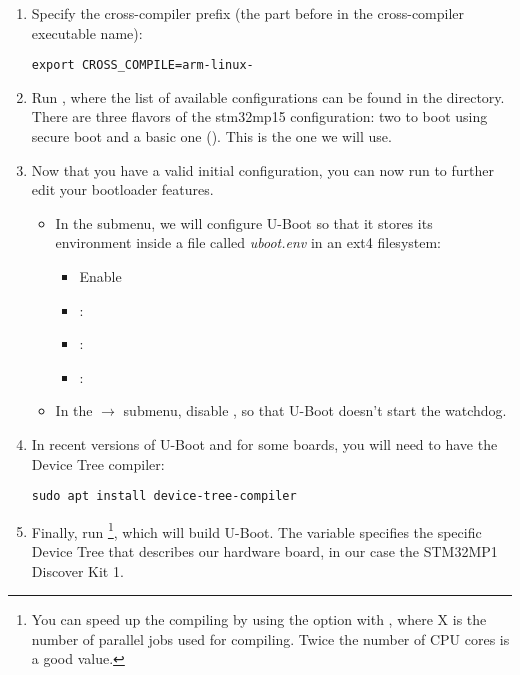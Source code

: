 \begin{enumerate}

\item Specify the cross-compiler prefix
(the part before  in the cross-compiler executable name):
\begin{verbatim}
export CROSS_COMPILE=arm-linux-
\end{verbatim}

\item Run , where the list of available
  configurations can be found in the  directory. There
  are three flavors of the stm32mp15 configuration: two to boot using
  secure boot and a basic one (). This is the
  one we will use.

\item Now that you have a valid initial configuration, you can now
  run  to further edit your bootloader features.
  \begin{itemize}
  \item In the  submenu, we will configure U-Boot so
    that it stores its environment inside a file called {\em
      uboot.env} in an ext4 filesystem:
    \begin{itemize}
    \item Enable 
    \item {}: 
    \item {}: 
    \item {}: 
    \end{itemize}
  \item In the  $\rightarrow$  submenu, disable , so that U-Boot doesn't start the
    watchdog.
  \end{itemize}

\item In recent versions of U-Boot and for some boards, you will
  need to have the Device Tree compiler:

\begin{verbatim}
sudo apt install device-tree-compiler
\end{verbatim}

\item Finally, run \footnote{You can speed up the
    compiling by using the  option with , where X
    is the number of parallel jobs used for compiling. Twice the
    number of CPU cores is a good value.}, which will build
  U-Boot. The  variable specifies the specific
  Device Tree that describes our hardware board, in our case the
  STM32MP1 Discover Kit 1.

\end{enumerate}

